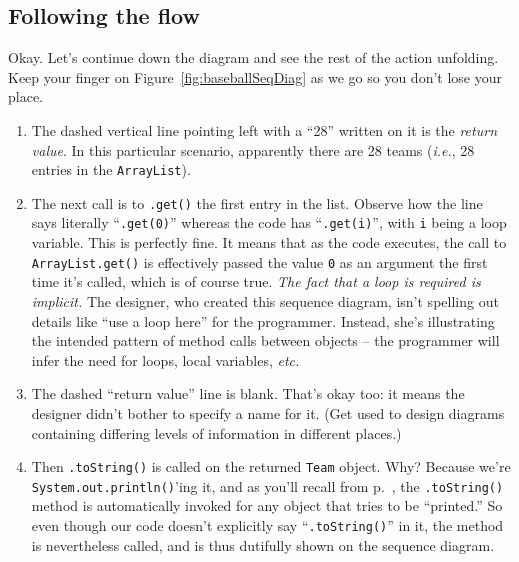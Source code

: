 \subsection{Following the flow}

Okay. Let's continue down the diagram and see the rest of the action
unfolding. Keep your finger on Figure~\ref{fig:baseballSeqDiag} as we go so
you don't lose your place.

\begin{enumerate}
\itemsep.1em

\item The dashed vertical line pointing left with a ``28'' written on it is the
\textit{return value}. In this particular scenario, apparently there are 28
teams (\textit{i.e.}, 28 entries in the \texttt{ArrayList}).

\item The next call is to \texttt{.get()} the first entry in the list. Observe
how the line says literally ``\texttt{.get(0)}'' whereas the code has
``\texttt{.get(i)}'', with \texttt{i} being a loop variable. This is perfectly
fine. It means that as the code executes, the call to \texttt{ArrayList.get()}
is effectively passed the value \texttt{0} as an argument the first time it's
called, which is of course true. \textit{The fact that a loop is required is
implicit.} The designer, who created this sequence diagram, isn't spelling out
details like ``use a loop here'' for the programmer. Instead, she's
illustrating the intended pattern of method calls between objects -- the
programmer will infer the need for loops, local variables, \textit{etc.}

\item The dashed ``return value'' line is blank. That's okay too: it means the
designer didn't bother to specify a name for it. (Get used to design diagrams
containing differing levels of information in different places.)

\item Then \texttt{.toString()} is called on the returned \texttt{Team}
object. Why? Because we're \texttt{System.out.println()}'ing it, and as you'll
recall from p.~\pageref{pg:toString}, the \texttt{.toString()} method is
automatically invoked for any object that tries to be ``printed.'' So even
though our code doesn't explicitly say ``\texttt{.toString()}'' in it, the
method is nevertheless called, and is thus dutifully shown on the sequence
diagram.


\end{enumerate}
